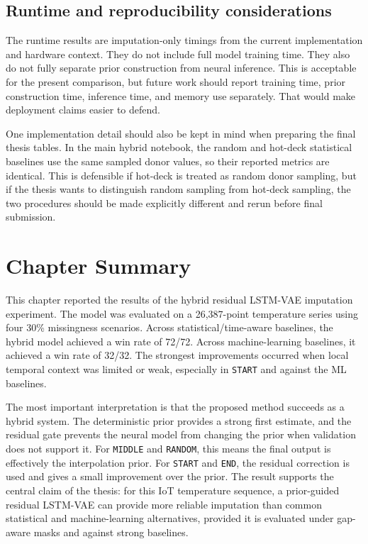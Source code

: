 \subsection{Runtime and reproducibility considerations}

The runtime results are imputation-only timings from the current implementation and hardware context. They do not include full model training time. They also do not fully separate prior construction from neural inference. This is acceptable for the present comparison, but future work should report training time, prior construction time, inference time, and memory use separately. That would make deployment claims easier to defend.

One implementation detail should also be kept in mind when preparing the final thesis tables. In the main hybrid notebook, the random and hot-deck statistical baselines use the same sampled donor values, so their reported metrics are identical. This is defensible if hot-deck is treated as random donor sampling, but if the thesis wants to distinguish random sampling from hot-deck sampling, the two procedures should be made explicitly different and rerun before final submission.

\section{Chapter Summary}

This chapter reported the results of the hybrid residual LSTM-VAE imputation experiment. The model was evaluated on a 26,387-point temperature series using four 30\% missingness scenarios. Across statistical/time-aware baselines, the hybrid model achieved a win rate of 72/72. Across machine-learning baselines, it achieved a win rate of 32/32. The strongest improvements occurred when local temporal context was limited or weak, especially in \texttt{START} and against the ML baselines.

The most important interpretation is that the proposed method succeeds as a hybrid system. The deterministic prior provides a strong first estimate, and the residual gate prevents the neural model from changing the prior when validation does not support it. For \texttt{MIDDLE} and \texttt{RANDOM}, this means the final output is effectively the interpolation prior. For \texttt{START} and \texttt{END}, the residual correction is used and gives a small improvement over the prior. The result supports the central claim of the thesis: for this IoT temperature sequence, a prior-guided residual LSTM-VAE can provide more reliable imputation than common statistical and machine-learning alternatives, provided it is evaluated under gap-aware masks and against strong baselines.
